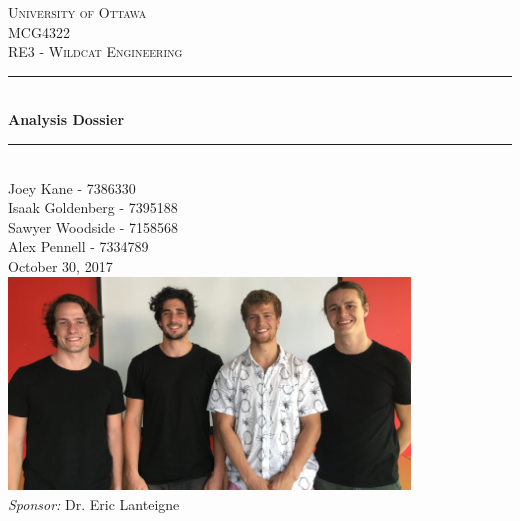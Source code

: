 \documentclass[12pt]{article}
\newcommand{\reporttitle}{Analysis Dossier}
\begin{document}
\begin{titlepage}
\newcommand{\HRule}{\rule{\linewidth}{0.5mm}}
\center
 
\textsc{\LARGE University of Ottawa}\\[1.5cm]
\textsc{\Large MCG4322}\\[0.5cm]
\textsc{\large RE3 - Wildcat Engineering}\\[0.5cm]

\HRule \\[0.4cm]
{\huge \bfseries \reporttitle{}}\\[0.1cm]
\HRule\\ [0.4cm]
 
\Large Joey Kane - 7386330\\
Isaak Goldenberg - 7395188\\
Sawyer Woodside - 7158568\\
Alex Pennell - 7334789\\[0.5cm]

{\large October 30, 2017}\\[0.5cm] %

\includegraphics[width=0.8\textwidth]{boys.PNG}\\[0.5cm]

\large \emph{Sponsor:} Dr. Eric Lanteigne

\vfill
\end{titlepage}

\shipout\null

\tableofcontents
\pagebreak
\end{document}
